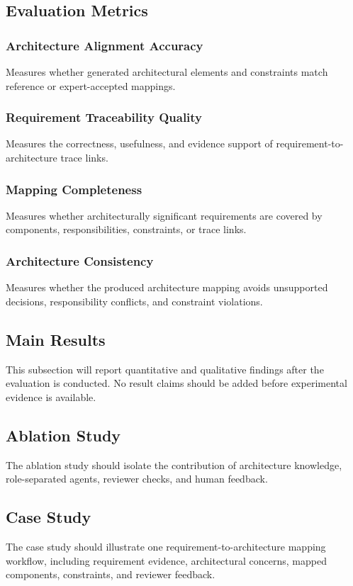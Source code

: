 \subsection{Evaluation Metrics}
\label{sec:exp-metrics}

\subsubsection{Architecture Alignment Accuracy}
\label{sec:exp-alignment-accuracy}

Measures whether generated architectural elements and constraints match reference or expert-accepted mappings.

\subsubsection{Requirement Traceability Quality}
\label{sec:exp-traceability-quality}

Measures the correctness, usefulness, and evidence support of requirement-to-architecture trace links.

\subsubsection{Mapping Completeness}
\label{sec:exp-mapping-completeness}

Measures whether architecturally significant requirements are covered by components, responsibilities, constraints, or trace links.

\subsubsection{Architecture Consistency}
\label{sec:exp-architecture-consistency}

Measures whether the produced architecture mapping avoids unsupported decisions, responsibility conflicts, and constraint violations.

\subsection{Main Results}
\label{sec:exp-main-results}

This subsection will report quantitative and qualitative findings after the evaluation is conducted.
No result claims should be added before experimental evidence is available.

\subsection{Ablation Study}
\label{sec:exp-ablation}

The ablation study should isolate the contribution of architecture knowledge, role-separated agents, reviewer checks, and human feedback.

\subsection{Case Study}
\label{sec:exp-case-study}

The case study should illustrate one requirement-to-architecture mapping workflow, including requirement evidence, architectural concerns, mapped components, constraints, and reviewer feedback.
